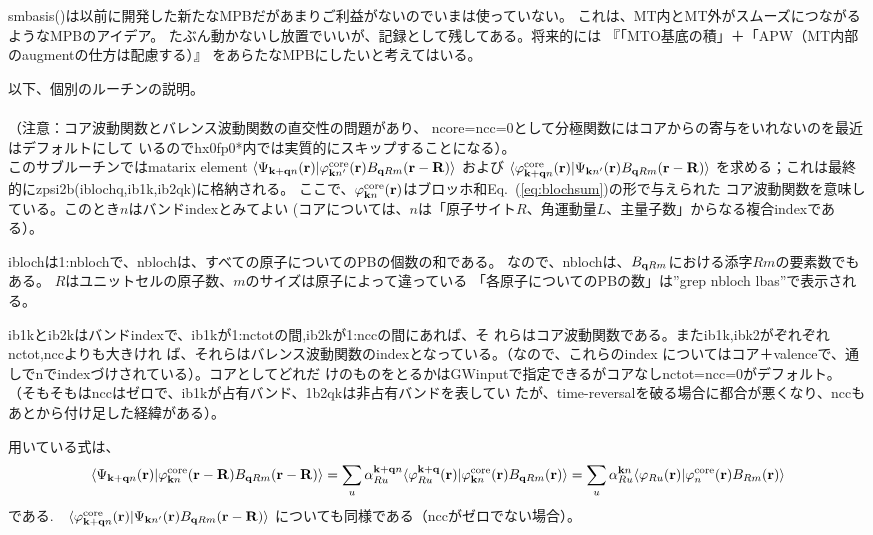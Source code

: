 \documentclass[a4paper,10pt,aip,onecolumn,amsmath,amssymb,floatfix,rmp]{revtex4-1}
\newcommand{\bfq}{{\bf q}}
\newcommand{\bfk}{{\bf k}}
\newcommand{\bfr}{{\bf r}}
\newcommand{\bfR}{{\bf R}}
\newcommand{\req}[1]{\mbox{Eq.~\!(\ref{#1})}}
\def\Psikqn{{\Psi_{{\bf k}+{\bf q} n}}}
\begin{document}
smbasis()は以前に開発した新たなMPBだがあまりご利益がないのでいまは使っていない。
これは、MT内とMT外がスムーズにつながるようなMPBのアイデア。
たぶん動かないし放置でいいが、記録として残してある。将来的には
『「MTO基底の積」＋「APW（MT内部のaugmentの仕方は配慮する）』
をあらたなMPBにしたいと考えてはいる。


以下、個別のルーチンの説明。\\

 \\
（注意：コア波動関数とバレンス波動関数の直交性の問題があり、
ncore=ncc=0として分極関数にはコアからの寄与をいれないのを最近はデフォルトにして
いるのでhx0fp0*内では実質的にスキップすることになる）。\\
このサブルーチンではmatarix element 
$\langle\Psikqn(\bfr)| \varphi^{\rm core}_{\bfk n'}(\bfr) B_{\bfq Rm}(\bfr-\bfR) \rangle$
および
$\langle\varphi^{\rm core}_{\bfk+\bfq n}(\bfr)| \Psi_{\bfk n'}(\bfr) B_{\bfq Rm}(\bfr-\bfR) \rangle$
を求める；これは最終的にzpsi2b(iblochq,ib1k,ib2qk)に格納される。
ここで、$\varphi^{\rm core}_{\bfk n}(\bfr)$はブロッホ和\req{eq:blochsum}の形で与えられた
コア波動関数を意味している。このとき$n$はバンドindexとみてよい
(コアについては、$n$は「原子サイト$R$、角運動量$L$、主量子数」からなる複合indexである）。

iblochは1:nblochで、nblochは、すべての原子についてのPBの個数の和である。
なので、nblochは、$B_{\bfq Rm}$における添字$Rm$の要素数でもある。
$R$はユニットセルの原子数、$m$のサイズは原子によって違っている
「各原子についてのPBの数」は”grep nbloch lbas”で表示される。

ib1kとib2kはバンドindexで、ib1kが1:nctotの間,ib2kが1:nccの間にあれば、そ
れらはコア波動関数である。またib1k,ibk2がぞれぞれnctot,nccよりも大きけれ
ば、それらはバレンス波動関数のindexとなっている。（なので、これらのindex
についてはコア＋valenceで、通しでnでindexづけされている）。コアとしてどれだ
けのものをとるかはGWinputで指定できるがコアなしnctot=ncc=0がデフォルト。
（そもそもはnccはゼロで、ib1kが占有バンド、1b2qkは非占有バンドを表してい
たが、time-reversalを破る場合に都合が悪くなり、nccもあとから付け足した経緯がある）。

用いている式は、
\begin{eqnarray}
\langle\Psikqn(\bfr)| \varphi^{\rm core}_{\bfk n}(\bfr-\bfR) B_{\bfq Rm}(\bfr-\bfR) \rangle
= \sum_{u} \alpha^{\bfk+\bfq n}_{Ru} 
\langle \varphi^{\bf k+q}_{Ru}(\bfr)|\varphi^{\rm core}_{{\bf k} n}(\bfr) B_{\bfq Rm}(\bfr) \rangle
= \sum_{u} \alpha^{\bfk n}_{Ru} 
\langle \varphi_{Ru}(\bfr)|\varphi^{\rm core}_{n}(\bfr) B_{Rm}(\bfr) \rangle
\nonumber \\
\end{eqnarray}
である.　$\langle\varphi^{\rm core}_{\bfk+\bfq n}(\bfr)| \Psi_{\bfk n'}(\bfr) B_{\bfq Rm}(\bfr-\bfR) \rangle$
についても同様である（nccがゼロでない場合）。
\end{document}
